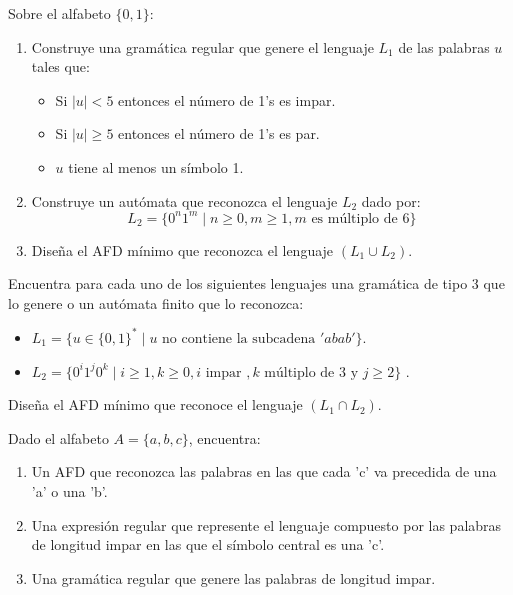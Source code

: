 \begin{ejercicio}\label{ej:1.3.23}
    Sobre el alfabeto $\{0,1\}$:
    \begin{enumerate}
        \item Construye una gramática regular que genere el lenguaje $L_1$ de las palabras $u$ tales que:
            \begin{itemize}
                \item Si $|u|< 5$ entonces el número de 1's es impar.
                \item Si $|u|\geq 5$ entonces el número de 1's es par.
                \item $u$ tiene al menos un símbolo 1.
            \end{itemize}
        \item Construye un autómata que reconozca el lenguaje $L_2$ dado por:
            \begin{equation*}
                L_2 = \{0^n 1^m \mid n\geq 0, m\geq 1, m \text{\ es múltiplo de\ } 6\}
            \end{equation*}
        \item Diseña el AFD mínimo que reconozca el lenguaje $(L_1 \cup L_2)$.
    \end{enumerate}
\end{ejercicio}

\begin{ejercicio}\label{ej:1.3.24}
    Encuentra para cada uno de los siguientes lenguajes una gramática de tipo 3 que lo genere o un autómata finito que lo reconozca:
    \begin{itemize}
        \item $L_1 = \{u\in {\{0,1\}}^{\ast} \mid u \text{\ no contiene la subcadena } 'abab'\}$.
        \item $L_2 = \{0^i 1^j 0^k \mid i \geq 1, k\geq 0, i \text{\ impar\ }, k \text{\ múltiplo de\ } 3 \text{\ y\ } j\geq 2\}$ .
    \end{itemize}
    Diseña el AFD mínimo que reconoce el lenguaje $(L_1\cap L_2)$.
\end{ejercicio}

\begin{ejercicio}\label{ej:1.3.25}
    Dado el alfabeto $A=\{a,b,c\}$, encuentra:
    \begin{enumerate}
        \item Un AFD que reconozca las palabras en las que cada 'c' va precedida de una 'a' o una 'b'.
        \item Una expresión regular que represente el lenguaje compuesto por las palabras de longitud impar en las que el símbolo central es una 'c'.
        \item Una gramática regular que genere las palabras de longitud impar.
    \end{enumerate}
\end{ejercicio}

